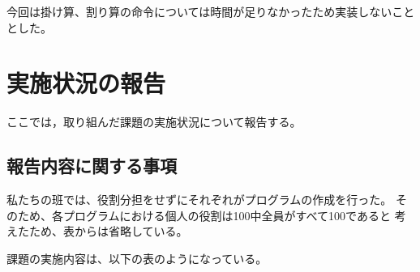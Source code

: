 \documentclass{jarticle}[11pt]
\begin{document}
今回は掛け算、割り算の命令については時間が足りなかったため実装しないこととした。







\section{実施状況の報告}
\label{sec:実施状況の報告}

ここでは，取り組んだ課題の実施状況について報告する。

\subsection{報告内容に関する事項}
私たちの班では、役割分担をせずにそれぞれがプログラムの作成を行った。
そのため、各プログラムにおける個人の役割は100中全員がすべて100であると
考えたため、表からは省略している。

課題の実施内容は、以下の表のようになっている。
\end{document}
